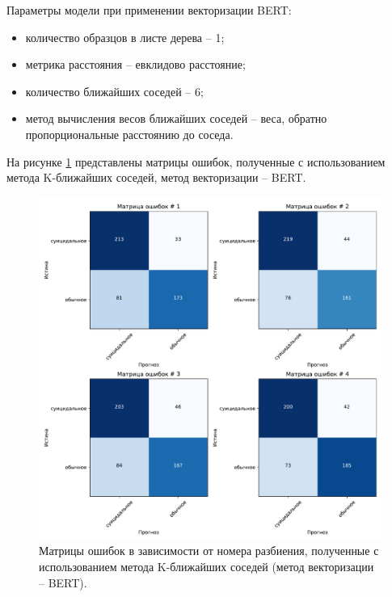 Параметры модели при применении векторизации BERT:
\begin{itemize}
	\item количество образцов в листе дерева -- 1;
	\item метрика расстояния -- евклидово расстояние;
	\item количество ближайших соседей -- 6;
	\item метод вычисления весов ближайших соседей -- веса, обратно пропорциональные расстоянию до соседа.
\end{itemize}

На рисунке \ref{img:knnMatrBert} представлены матрицы ошибок, полученные с использованием метода K-ближайших соседей, метод векторизации -- BERT.
\begin{figure}[H]
	\centering
	\includegraphics[width=\textwidth]{inc/plots/knnMatrBert.pdf}
	\caption{ Матрицы ошибок в зависимости от номера разбиения, полученные с использованием метода K-ближайших соседей (метод векторизации -- BERT). }
	\label{img:knnMatrBert}
\end{figure}


